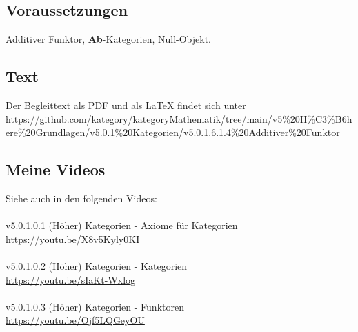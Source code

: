 \documentclass[a4paper]{amsart}
\theoremstyle{definition}
\begin{document}
\subsection*{Voraussetzungen}
Additiver Funktor, \textbf{Ab}-Kategorien, Null-Objekt.

\subsection*{Text}
Der Begleittext als PDF und als LaTeX findet sich unter
{\tiny
   \url{https://github.com/kategory/kategoryMathematik/tree/main/v5%20H%C3%B6here%20Grundlagen/v5.0.1%20Kategorien/v5.0.1.6.1.4%20Additiver%20Funktor}
}

\subsection*{Meine Videos}
Siehe auch in den folgenden Videos:\\ \\
v5.0.1.0.1 (Höher) Kategorien - Axiome für Kategorien\\
\url{https://youtu.be/X8v5Kyly0KI}\\
\\
v5.0.1.0.2 (Höher) Kategorien - Kategorien\\
\url{https://youtu.be/sIaKt-Wxlog}\\
\\
v5.0.1.0.3 (Höher) Kategorien - Funktoren\\
\url{https://youtu.be/Ojf5LQGeyOU}

\end{document}
